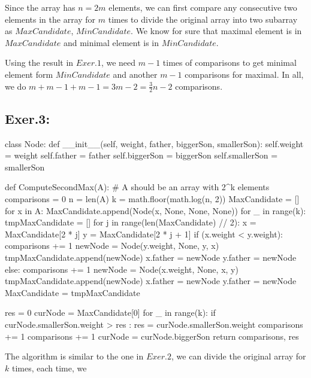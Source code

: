 \documentclass[UTF8]{ctexart}
\begin{document}
    Since the array has $n = 2m$ elements, we can first compare any consecutive two elements in the array    for $m$ times to divide the original array into two subarray as $MaxCandidate$, $MinCandidate$. We know for sure that
    maximal element is in $MaxCandidate$ and minimal element is in $MinCandidate$.
    
    Using the result in  $Exer.1$, we need $m - 1$ times of comparisons to get minimal element form $MinCandidate$
    and another $m - 1$ comparisons for maximal. In all, we do $m + m - 1 + m - 1 = 3m-2 =\frac{3}{2}n - 2$ comparisons.

\subsection*{Exer.3:}
\begin{python}
class Node:
    def __init__(self, weight, father, biggerSon, smallerSon):
        self.weight = weight
        self.father = father
        self.biggerSon = biggerSon
        self.smallerSon = smallerSon

def ComputeSecondMax(A):
        # A should be an array with 2^k elements
        comparisons = 0
        n = len(A)
        k = math.floor(math.log(n, 2))
        MaxCandidate = []
        for x in A:
            MaxCandidate.append(Node(x, None, None, None))
        for _ in range(k):
            tmpMaxCandidate = []
            for j in range(len(MaxCandidate) // 2):
                x = MaxCandidate[2 * j]
                y = MaxCandidate[2 * j + 1]
                if (x.weight < y.weight):
                    comparisons += 1
                    newNode = Node(y.weight, None, y, x)
                    tmpMaxCandidate.append(newNode)
                    x.father = newNode
                    y.father = newNode
                else:
                    comparisons += 1
                    newNode = Node(x.weight, None, x, y)
                    tmpMaxCandidate.append(newNode)
                    x.father = newNode
                    y.father = newNode
            MaxCandidate = tmpMaxCandidate

        res = 0
        curNode = MaxCandidate[0]
        for _ in range(k):
            if curNode.smallerSon.weight > res :
                res = curNode.smallerSon.weight
                comparisons += 1
            comparisons += 1
            curNode = curNode.biggerSon
        return comparisons, res
\end{python}
    \hspace*{1em} The algorithm is similar to the one in $Exer.2$, we can divide the original array for $k$ times, each time, we 
\end{document}
